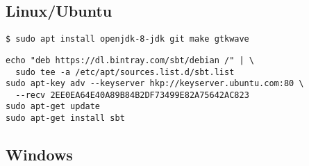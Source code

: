 \documentclass[%
    10pt,
    headinclude, footexclude,
    openright, %
    notitlepage,
    cleardoubleempty,
    headsepline,
    pointlessnumbers,
    bibtotoc, idxtotoc,
    ]{scrbook}
\newif\ifshoworiginal
\newif\ifshowtrans
\newcommand{\code}[1]{{\small{\texttt{#1}}}}
\newcommand{\myref}[2]{\href{#1}{#2}}
\renewcommand{\myref}[2]{{#2}{\footnote{\url{#1}}}}
\begin{document}
\begin{flushleft}
\subsection{Linux/Ubuntu}

\ifshoworiginal
Install Java and useful tools in Ubuntu with:
\fi

\ifshowtrans %
Ubuntuでは次のコマンドでJavaと役に立つツール類をインストールできます。
\fi

\begin{verbatim}
$ sudo apt install openjdk-8-jdk git make gtkwave
\end{verbatim}

\ifshoworiginal
For Ubuntu, which is based on Debian, programs are usually installed from a
Debian file (.deb). However, as of the time of this writing, \code{sbt} is not
available as a ready to install package. Therefore, the installation process
is a little bit more involved:
\fi

\ifshowtrans %
UbuntuはDebianが元になっているため、プログラムはたいていDebianファイル（.deb）からインストールできます。
しかし本書の執筆時点では、\code{sbt}はインストール可能なパッケージが存在していませんでした。そのためインストール手順が少し複雑になります。
\fi

\begin{verbatim}
echo "deb https://dl.bintray.com/sbt/debian /" | \
  sudo tee -a /etc/apt/sources.list.d/sbt.list
sudo apt-key adv --keyserver hkp://keyserver.ubuntu.com:80 \
  --recv 2EE0EA64E40A89B84B2DF73499E82A75642AC823
sudo apt-get update
sudo apt-get install sbt
\end{verbatim}

\subsection{Windows}

\ifshoworiginal
Install the Java OpenJDK from \myref{https://adoptopenjdk.net/}{AdoptOpenJDK}.
Chisel and Scala can also be installed and used under Windows.
Install \myref{http://gtkwave.sourceforge.net/}{GTKWave} and
\myref{https://www.jetbrains.com/idea/download/}{IntelliJ} (the community edition).
When importing a project, {\textbf select the JDK 1.8} you installed before (not Java 11!)
\code{sbt} can be installed with a Windows installer, see:
\myref{https://www.scala-sbt.org/1.x/docs/Installing-sbt-on-Windows.html}{Installing sbt on Windows}.
Install a \myref{https://git-scm.com/download/win}{git client}.
\fi


\end{flushleft}
\end{document}
